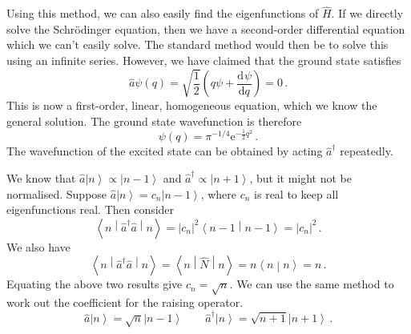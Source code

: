 \documentclass{article}
\theoremstyle{plain}\theoremheaderfont{\normalfont\itshape}\theorembodyfont{\rmfamily}\theoremseparator{.}\newtheorem*{rem}{Remark}\newtheorem*{ex}{Example}\newtheorem*{proof}{Proof}\newtheorem*{altp}{Alternative proof}
\theoremstyle{plain}\theoremheaderfont{\normalfont\bfseries}\theorembodyfont{\rmfamily}\theoremseparator{.}\newtheorem{thm}{Theorem}[section]\newtheorem{lem}[thm]{Lemma}\newtheorem{prop}[thm]{Proposition}\newtheorem*{cor}{Corollary}\newtheorem{defn}[thm]{Definition}\newtheorem{clm}[thm]{Claim}\newtheorem{clminproof}{Claim}
\theoremstyle{break}\theoremheaderfont{\normalfont\itshape}\theorembodyfont{\rmfamily}\theoremseparator{.\medskip}\newtheorem*{proofskip}{Proof}\newtheorem*{exs}{Examples}\newtheorem*{rems}{Remarks}
\theoremstyle{break}\theoremheaderfont{\normalfont\bfseries}\theorembodyfont{\rmfamily}\theoremseparator{.\medskip}\newtheorem{lemskip}[thm]{Lemma}\newtheorem{defnskip}[thm]{Definition}\newtheorem{propskip}[thm]{Proposition}\newtheorem{thmskip}[thm]{Theorem}
\numberwithin{equation}{section}
\newcommand{\ee}{\mathrm{e}}
\newcommand{\dv}[3][]{\frac{\mathrm{d}^{#1} #2}{{\mathrm{d} #3}^{#1}}}
\newcommand{\ket}[1]{\left| #1 \right\rangle}
\newcommand{\braket}[2]{\left\langle #1 \middle| #2 \right\rangle}
\newcommand{\expval}[2]{\left\langle #2 \middle| #1 \middle| #2 \right\rangle}
\newcommand{\abs}[1]{\left| #1 \right|}
\begin{document}
    Using this method, we can also easily find the eigenfunctions of \(\hat{H}\). If we directly solve the Schr\"{o}dinger equation, then we have a second-order differential equation which we can't easily solve. The standard method would then be to solve this using an infinite series. However, we have claimed that the ground state satisfies
    \begin{equation}
        \hat{a}\psi(q)=\sqrt{\frac{1}{2}}\left(q\psi+\dv{\psi}{q}\right)=0\,.
    \end{equation}
    This is now a first-order, linear, homogeneous equation, which we know the general solution. The ground state wavefunction is therefore
    \begin{equation}
        \psi(q)=\pi^{-1/4}\ee^{-\frac{1}{2}q^2}\,.
    \end{equation}
    The wavefunction of the excited state can be obtained by acting \(\hat{a}^\dagger\) repeatedly.

    We know that \(\hat{a}\ket{n}\propto\ket{n-1}\) and \(\hat{a}^\dagger\propto\ket{n+1}\), but it might not be normalised. Suppose \(\hat{a}\ket{n}=c_n\ket{n-1}\), where \(c_n\) is real to keep all eigenfunctions real. Then consider
    \begin{equation}
        \expval{\hat{a}^\dagger\hat{a}}{n}=\abs{c_n}^2\braket{n-1}{n-1}=\abs{c_n}^2\,.
    \end{equation}
    We also have
    \begin{equation}
        \expval{\hat{a}^\dagger\hat{a}}{n}=\expval{\hat{N}}{n}=n\braket{n}{n}=n\,.
    \end{equation}
    Equating the above two results give \(c_n=\sqrt{n}\). We can use the same method to work out the coefficient for the raising operator.
    \begin{equation}
        \hat{a}\ket{n}=\sqrt{n}\ket{n-1}\qquad\hat{a}^\dagger\ket{n}=\sqrt{n+1}\ket{n+1}\,.
    \end{equation}
\end{document}
